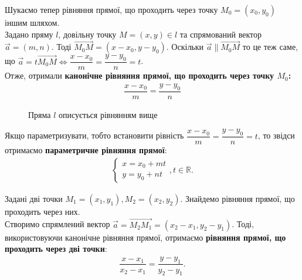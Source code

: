 \documentclass[a4paper, 10pt]{extarticle}
\theoremstyle{theoremdd}
\theoremstyle{theoremdd}
\theoremstyle{theoremdd}
\theoremstyle{theoremdd}
\theoremstyle{theoremdd}
\theoremstyle{theoremdd}
\theoremstyle{theoremdd}
\theoremstyle{theoremdd}
\begin{document}
Шукаємо тепер рівняння прямої, що проходить через точку $M_0 = (x_0, y_0)$ іншим шляхом.\\
Задано пряму $l$, довільну точку $M = (x,y) \in l$ та спрямований вектор $\vec{a} = (m,n)$. Тоді $\overrightarrow{M_0M} = (x-x_0, y-y_0)$. Оскільки $\vec{a} \parallel \overrightarrow{M_0M}$ то це теж саме, що $\vec{a} = t \overrightarrow{M_0 M} \iff
\dfrac{x-x_0}{m} = \dfrac{y-y_0}{n} = t$.\\
Отже, отримали \textbf{канонічне рівняння прямої, що проходить через точку $M_0$:}
\begin{align*}
\dfrac{x-x_0}{m} = \dfrac{y-y_0}{n}
\end{align*}

\begin{figure}[H]
\centering
{}
\caption*{Пряма $l$ описується рівнянням вище}
\end{figure}

Якщо параметризувати, тобто встановити рівність $\dfrac{x-x_0}{m} = \dfrac{y-y_0}{n} = t$, то звідси отримаємо \textbf{параметричне рівняння прямої}:
\begin{align*}
\begin{cases}
x = x_0 + mt\\
y = y_0 + nt
\end{cases}, t \in \mathbb{R}.
\end{align*}

Задані дві точки $M_1 = (x_1,y_1), M_2 = (x_2,y_2)$. Знайдемо рівняння прямої, що проходить через них.\\
Створимо спрямлений вектор $\vec{a} = \overrightarrow{M_2M_1} = (x_2-x_1,y_2-y_1)$. Тоді, використовуючи канонічне рівняння прямої, отримаємо \textbf{рівняння прямої, що проходить через дві точки}:
\begin{align*}
\dfrac{x-x_1}{x_2-x_1} = \dfrac{y-y_1}{y_2-y_1}.
\end{align*}
\end{document}
